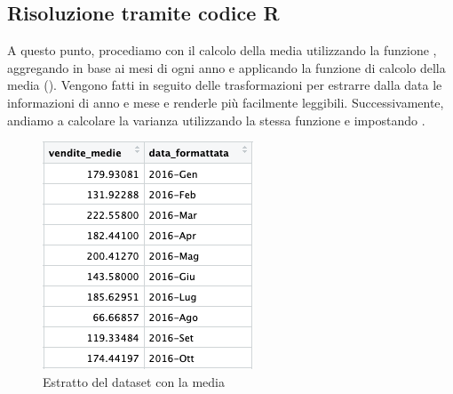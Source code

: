 \subsection{Risoluzione tramite codice R}
A questo punto, procediamo con il calcolo della media utilizzando la funzione , aggregando in base ai mesi di ogni anno e applicando la funzione di calcolo della media (). Vengono fatti in seguito delle trasformazioni per estrarre dalla data le informazioni di anno e mese e renderle più facilmente leggibili. Successivamente, andiamo a calcolare la varianza utilizzando la stessa funzione  e impostando .


\begin{figure}[ht]
\centering
\begin{minipage}{.3\textwidth}
    \centering
    \includegraphics[width=\linewidth]{img/media_r.png}
    \caption{Estratto del dataset con la media}
    \label{fig:immagine1}
\end{minipage}
\begin{minipage}{.3\textwidth}
    \centering
    \end{minipage}
\begin{minipage}{.3\textwidth}
    \centering

\end{minipage}
\end{figure}
